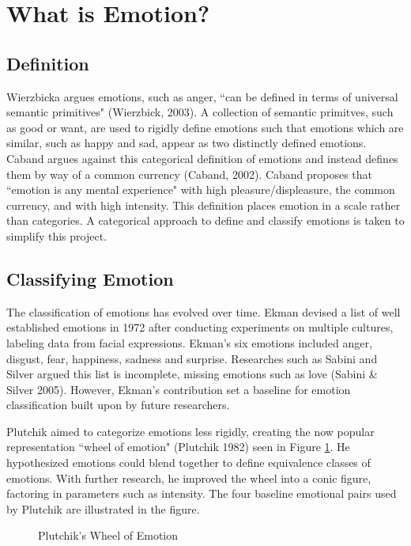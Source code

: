 	
\section{What is Emotion?}
	
\subsection{Definition}
	Wierzbicka argues emotions, such as anger, ``can be defined in terms of universal semantic primitives" (Wierzbick, 2003). A collection of semantic primitves, such as good or want, are used to rigidly define emotions such that emotions which are similar, such as happy and sad, appear as two distinctly defined emotions. Caband argues against this categorical definition of emotions and instead defines them by way of a common currency (Caband, 2002). Caband proposes that ``emotion is any mental experience" with high pleasure/displeasure, the common currency, and with high intensity. This definition places emotion in a scale rather than categories. A categorical approach to define and classify emotions is taken to simplify this project.

\subsection{Classifying Emotion}
	The classification of emotions has evolved over time. Ekman devised a list of well established emotions in 1972 after conducting experiments on multiple cultures, labeling data from facial expressions. Ekman's six emotions included anger, disgust, fear, happiness, sadness and surprise. Researches such as Sabini and Silver argued this list is incomplete, missing emotions such as love (Sabini \& Silver 2005). However, Ekman's contribution set a baseline for emotion classification built upon by future researchers.

	Plutchik aimed to categorize emotions less rigidly, creating the now popular representation ``wheel of emotion" (Plutchik 1982) seen in Figure \ref{fig:emotioncone}. He hypothesized emotions could blend together to define equivalence classes of emotions. With further research, he improved the wheel into a conic figure, factoring in parameters such as intensity. The four baseline emotional pairs used by Plutchik are illustrated in the figure. 
	
		\begin{figure}[!htb]
		\caption{\label{fig:emotioncone} Plutchik's Wheel of Emotion}
	\end{figure}

